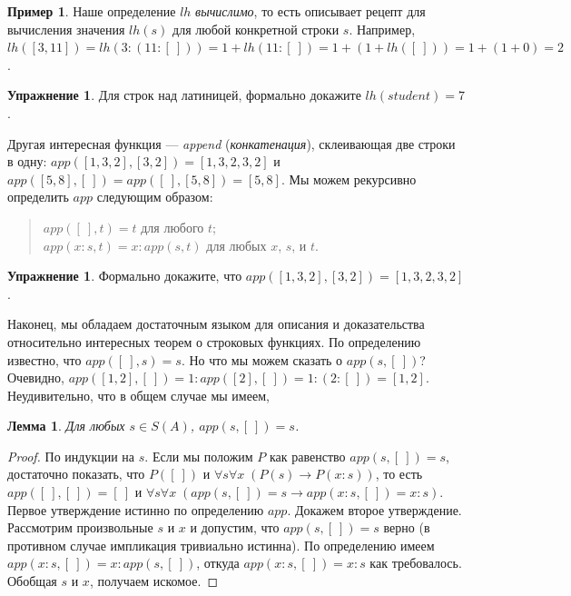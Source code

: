 \documentclass[12pt,notitlepage]{article}
\theoremstyle{plain}
\newtheorem{lemma}[thm]{Лемма}
\theoremstyle{definition}
\newtheorem{exc}[thm]{Упражнение}
\newtheorem{exm}[thm]{Пример}
\theoremstyle{plain}
\newcommand{\1}{\mathbf{1}}
\newcommand{\0}{\mathbf{0}}
\newcommand{\mcomm}[1]{}
\begin{document}
\mcomm{It is easy to prove the uniqueness by IP application but the existence would likely require some `set-theoretic' considerations, which we want to avoid here.}

\begin{exm}
	Наше определение $lh$ \emph{вычислимо}, то есть описывает рецепт для вычисления значения $lh(s)$ для любой конкретной строки $s$. Например, $lh([3,11]) = lh (3:(11:[\ ])) = 1 + lh (11:[\ ]) = 1 + (1 + lh([\ ])) = 1 + (1 + 0) = 2$.
\end{exm}

\begin{exc}
	Для строк над латиницей, формально докажите $lh(student) = 7$.
\end{exc}

Другая интересная функция --- \emph{append} (\emph{конкатенация}), склеивающая две строки в одну: $app([1,3,2],[3,2]) = [1,3,2,3,2]$ и $app([5,8], [\ ]) = app([\ ], [5,8]) = [5, 8]$. Мы можем рекурсивно определить $app$ следующим образом:
\begin{quote}
	$app([\ ], t) = t$ для любого $t$;\\
	$app(x : s, t) = x : app(s, t)$ для любых $x$, $s$, и $t$.
\end{quote}
\begin{exc}
	Формально докажите, что $app([1,3,2],[3,2]) = [1,3,2,3,2]$.
\end{exc}

Наконец, мы обладаем достаточным языком для описания и доказательства относительно интересных теорем о строковых функциях. По определению известно, что $app([\ ], s) = s$. Но что мы можем сказать о $app (s, [\ ])$? Очевидно, $app ([1, 2], [\ ]) = 1 : app ([2],  [\ ]) = 1 : (2 : [\ ]) = [1, 2]$. Неудивительно, что в общем случае мы имеем,
\begin{lemma}\label{cs:app_nil_r}
	Для любых $s \in S(A)$, $app (s, [\ ]) = s$.
\end{lemma}
\begin{proof}
	По индукции на $s$. Если мы положим $P$ как равенство $app (s, [\ ]) = s$, достаточно показать, что $P([\ ])$ и $\forall s \forall x\; (P(s) \to P(x:s))$, то есть $app ([\ ], [\ ]) = [\ ]$ и $\forall s \forall x\; (app (s, [\ ]) = s \to app (x : s, [\ ]) = x : s)$. Первое утверждение истинно по определению $app$. Докажем второе утверждение. Рассмотрим произвольные $s$ и $x$ и допустим, что $app (s, [\ ]) = s$ верно (в противном случае импликация тривиально истинна). По определению имеем $app (x : s, [\ ]) = x : app(s, [\ ])$, откуда $app (x : s, [\ ]) = x : s$ как требовалось. Обобщая $s$ и $x$, получаем искомое.
\end{proof}
\end{document}
